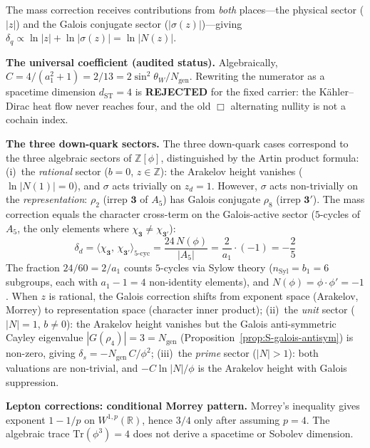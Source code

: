 \documentclass[12pt,a4paper]{article}
\theoremstyle{definition}
\begin{document}
The mass correction receives contributions from \emph{both} places---the physical sector ($|z|$) and the Galois conjugate sector ($|\sigma(z)|$)---giving $\delta_q \propto \ln|z| + \ln|\sigma(z)| = \ln|N(z)|$.

\textbf{The universal coefficient (audited status).}  Algebraically, $C=4/(a_1^2+1)=2/13=2\sin^2\theta_W/N_{\mathrm{gen}}$.  Rewriting the numerator as a spacetime dimension $d_{\mathrm{ST}}=4$ is \textbf{REJECTED} for the fixed carrier: the K\"ahler--Dirac heat flow never reaches four, and the old $\Box$ alternating nullity is not a cochain index.

\textbf{The three down-quark sectors.}  The three down-quark cases correspond to the three algebraic sectors of $\mathbb{Z}[\phi]$, distinguished by the Artin product formula: (i)~the \emph{rational} sector ($b = 0$, $z \in \mathbb{Z}$): the Arakelov height vanishes ($\ln|N(1)| = 0$), and $\sigma$ acts trivially on $z_d = 1$.  However, $\sigma$ acts non-trivially on the \emph{representation}: $\rho_2$ (irrep $\mathbf{3}$ of $A_5$) has Galois conjugate $\rho_8$ (irrep $\mathbf{3'}$).  The mass correction equals the character cross-term on the Galois-active sector ($5$-cycles of $A_5$, the only elements where $\chi_{\mathbf{3}} \neq \chi_{\mathbf{3'}}$):
\begin{equation}
\delta_d = \bigl\langle\chi_{\mathbf{3}},\,\chi_{\mathbf{3'}}\bigr\rangle_{\!\text{5-cyc}}
= \frac{24\,N(\phi)}{|A_5|}
= \frac{2}{a_1}\cdot(-1) = -\frac{2}{5}
\end{equation}
The fraction $24/60 = 2/a_1$ counts $5$-cycles via Sylow theory ($n_{\mathrm{Syl}} = b_1 = 6$ subgroups, each with $a_1-1 = 4$ non-identity elements), and $N(\phi) = \phi\cdot\phi' = -1$.  When $z$ is rational, the Galois correction shifts from exponent space (Arakelov, Morrey) to representation space (character inner product);
(ii)~the \emph{unit} sector ($|N| = 1$, $b \neq 0$): the Arakelov height vanishes but the Galois anti-symmetric Cayley eigenvalue $|G(\rho_4)| = 3 = N_{\text{gen}}$ (Proposition~\ref{prop:S-galois-antisym}) is non-zero, giving $\delta_s = -N_{\text{gen}}\,C/\phi^2$; (iii)~the \emph{prime} sector ($|N| > 1$): both valuations are non-trivial, and $-C\ln|N|/\phi$ is the Arakelov height with Galois suppression.

\textbf{Lepton corrections: conditional Morrey pattern.}  Morrey's inequality gives exponent $1-1/p$ on $W^{1,p}(\mathbb R)$, hence $3/4$ only after assuming $p=4$.  The algebraic trace $\mathrm{Tr}(\phi^3)=4$ does not derive a spacetime or Sobolev dimension.
\end{document}
